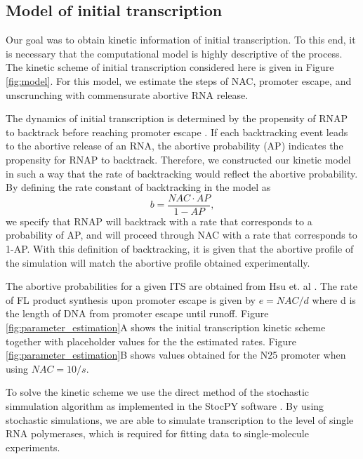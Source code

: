 %
\subsection{Model of initial transcription}
Our goal was to obtain kinetic information of initial transcription. To this
end, it is necessary that the computational model is highly descriptive of the
process. The kinetic scheme of initial transcription considered here is given
in Figure \ref{fig:model}. For this model, we estimate the steps of NAC,
promoter escape, and unscrunching with commensurate abortive RNA release.

The dynamics of initial transcription is determined by the propensity
of RNAP to backtrack before reaching promoter escape
\cite{revyakin_abortive_2006}. If each backtracking event leads to the
abortive release of an RNA, the abortive probability (AP)
\cite{hsu_quantitative_1996} indicates the propensity for RNAP to backtrack.
Therefore, we constructed our kinetic model in such a way that the rate of
backtracking would reflect the abortive probability. By defining the rate
constant of backtracking in the model as 
\begin{equation*}
    b = \frac{NAC\cdot AP}{1-AP},
\end{equation*}
we specify that RNAP will backtrack with a rate that corresponds to a
probability of AP, and will proceed through NAC with a rate that corresponds
to 1-AP. With this definition of backtracking, it is given that the abortive
profile of the simulation will match the abortive profile obtained
experimentally. 

The abortive probabilities for a given ITS are obtained from Hsu et. al
\cite{hsu_initial_2006}. The rate of FL product synthesis upon promoter escape
is given by $e = NAC/d$ where d is the length of DNA from promoter escape
until runoff. Figure \ref{fig:parameter_estimation}A shows the initial
transcription kinetic scheme together with placeholder values for the the
estimated rates. Figure \ref{fig:parameter_estimation}B shows values obtained
for the N25 promoter when using $NAC=10/s$. 

To solve the kinetic scheme we use the direct method of the stochastic
simmulation algorithm \cite{gillespie_exact_1977} as implemented in the StocPY
software \cite{maarleveld_stochpy:_2013}. By using stochastic simulations, we
are able to simulate transcription to the level of single RNA polymerases,
which is required for fitting data to single-molecule experiments.

